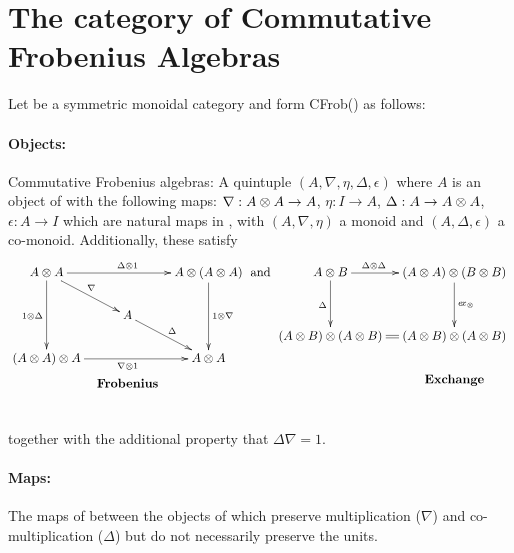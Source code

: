 \section{The category of Commutative Frobenius Algebras} %
\label{sec:the_category_of_commutative_frobenius_algebras}
\begin{example}\label{example:commfrob}
  Let \X be a symmetric monoidal category and form CFrob(\X) as follows: \paragraph{Objects:}
  Commutative Frobenius algebras\cite{kock04}: A quintuple $(A,\nabla,\eta,\Delta,\epsilon)$ where
  $A$ is an object of \X with the following maps:
  $\nabla :A\otimes A \to A$, $\eta:I\to A$, $\Delta : A \to A\otimes A$, $\epsilon : A \to I$ which are natural
  maps in \X, with $(A,\nabla,\eta)$ a monoid and $(A,\Delta,\epsilon)$ a co-monoid. Additionally, these
  satisfy
  \[
    \xymatrix @C=10pt @R=20pt{
      A \* A \ar[dd]_{1\*\Delta} \ar[dr]^{\nabla}
        \ar[rr]^{\Delta \* 1} & &
        A \* (A \* A) \ar[dd]^{1 \* \nabla}\\
      & A \ar[dr]^{\Delta} & \\
      (A \* A) \* A \ar[rr]_{\nabla \* 1} & &
        A \* A\\
      &*!<0pc,-25pt>{\text{\textbf{Frobenius}}}
    }\text{ and }
    \xymatrix @C=10pt @R=35pt{
      A \* B \ar[d]_{\Delta}
      \ar[r]^(.35){\Delta \* \Delta} &
      (A \* A) \* (B \* B) \ar[d]^{\excs}\\
      (A \* B) \* (A \* B) \ar@{=}[r] &
      (A \* B) \* (A \* B)\\
      &*!<0pc,-25pt>{\text{\textbf{Exchange}}}
    }
  \]
  together with the additional property that $\Delta \nabla = 1$.

  \paragraph{Maps:} The maps of \X between the objects of \X which preserve multiplication ($\nabla$)
  and co-multiplication ($\Delta$) but do not necessarily preserve the units.
\end{example}

